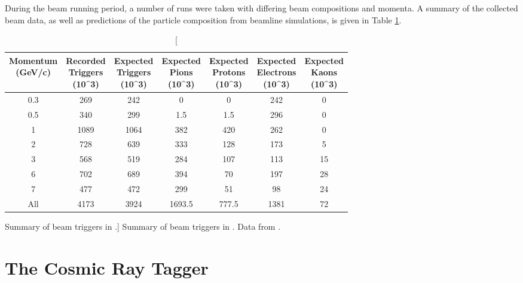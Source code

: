 During the beam running period, a number of runs were taken with differing beam
compositions and momenta. A summary of the collected beam data, as well as
predictions of the particle composition from beamline simulations, is given in 
Table \ref{tab:beam_runs}.
\begin{table}
	\centering
	\begin{tabular}{c|c|c|c|c|c|c}
		\thead{Momentum \\ (GeV/c)} & \thead{Recorded \\ Triggers \\ (10^3)} &
		\thead{Expected \\Triggers \\ (10^3)} & \thead{Expected \\ Pions \\ (10^3)} &
		\thead{Expected \\Protons \\ (10^3)} & \thead{Expected \\Electrons \\ (10^3)} &
		\thead{Expected \\ Kaons \\ (10^3)} \\ \hline
		0.3 & 269  & 242  & 0      & 0     & 242  & 0 \\
		0.5 & 340  & 299  & 1.5    & 1.5   & 296  & 0 \\
		1   & 1089 & 1064 & 382    & 420   & 262  & 0 \\
		2   & 728  & 639  & 333    & 128   & 173  & 5 \\
		3   & 568  & 519  & 284    & 107   & 113  & 15 \\
		6   & 702  & 689  & 394    & 70    & 197  & 28 \\
		7   & 477  & 472  & 299    & 51    & 98   & 24 \\ \hline
		All & 4173 & 3924 & 1693.5 & 777.5 & 1381 & 72 \\
	\end{tabular}

	\caption
	[Summary of beam triggers in \protodune{}.]
	{ Summary of beam triggers in \protodune{}. Data from \cite{TODO}.}

	\label{tab:beam_runs}

\end{table}

\section{The Cosmic Ray Tagger} \label{sec:pdsp_cosmic}

